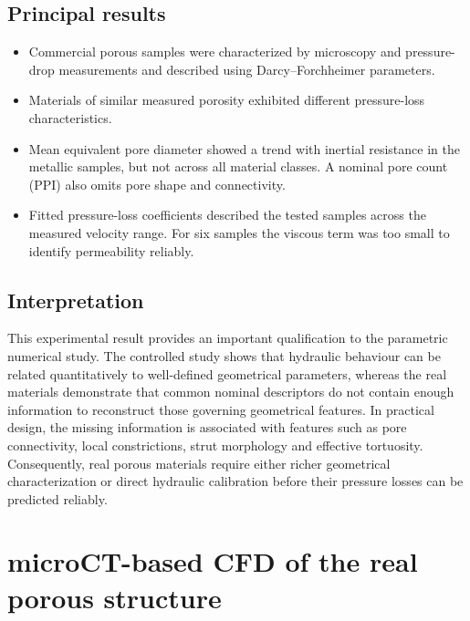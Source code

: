 \documentclass[a4paper]{article}
\begin{document}
\subsection*{Principal results}
\begin{itemize}
    \item Commercial porous samples were characterized by microscopy and pressure-drop measurements and described using Darcy--Forchheimer parameters.
    \item Materials of similar measured porosity exhibited different pressure-loss characteristics.
    \item Mean equivalent pore diameter showed a trend with inertial resistance in the metallic samples, but not across all material classes. A nominal pore count (PPI) also omits pore shape and connectivity.
    \item Fitted pressure-loss coefficients described the tested samples across the measured velocity range. For six samples the viscous term was too small to identify permeability reliably.
\end{itemize}

\subsection*{Interpretation}
This experimental result provides an important qualification to the parametric numerical study. The controlled study shows that hydraulic behaviour can be related quantitatively to well-defined geometrical parameters, whereas the real materials demonstrate that common nominal descriptors do not contain enough information to reconstruct those governing geometrical features. In practical design, the missing information is associated with features such as pore connectivity, local constrictions, strut morphology and effective tortuosity. Consequently, real porous materials require either richer geometrical characterization or direct hydraulic calibration before their pressure losses can be predicted reliably.

\section{microCT-based CFD of the real porous structure}
\end{document}

